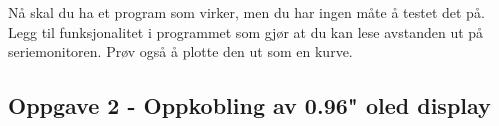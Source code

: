 Nå skal du ha et program som virker, men du har ingen måte å testet det på. Legg til funksjonalitet i programmet som gjør at du kan lese avstanden ut på seriemonitoren. Prøv også  å plotte den ut som en kurve. 

\subsection*{Oppgave 2 -  Oppkobling av 0.96" oled display}





\newpage



